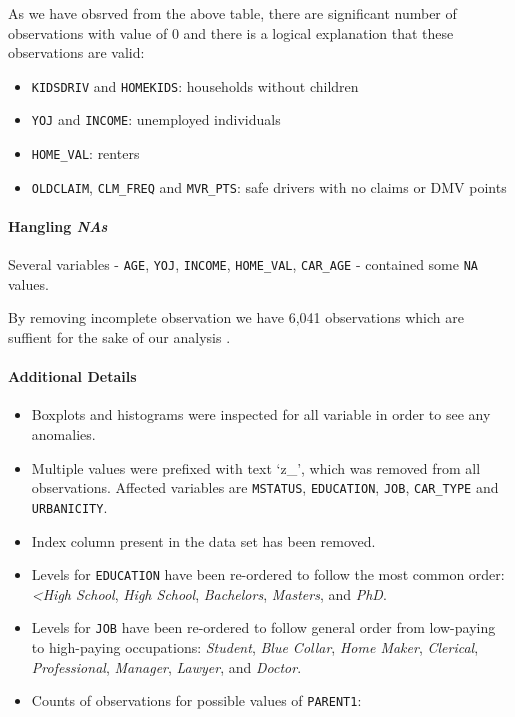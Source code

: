 \documentclass[]{article}
\providecommand{\tightlist}{%
  \setlength{\itemsep}{0pt}\setlength{\parskip}{0pt}}
\let\oldparagraph\paragraph
\renewcommand{\paragraph}[1]{\oldparagraph{#1}\mbox{}}
\begin{document}
As we have obsrved from the above table, there are significant number of
observations with value of 0 and there is a logical explanation that
these observations are valid:

\begin{itemize}
\tightlist
\item
  \texttt{KIDSDRIV} and \texttt{HOMEKIDS}: households without children
\item
  \texttt{YOJ} and \texttt{INCOME}: unemployed individuals
\item
  \texttt{HOME\_VAL}: renters
\item
  \texttt{OLDCLAIM}, \texttt{CLM\_FREQ} and \texttt{MVR\_PTS}: safe
  drivers with no claims or DMV points
\end{itemize}

\paragraph{\texorpdfstring{Hangling
\emph{NAs}}{Hangling NAs}}\label{hangling-nas}

Several variables - \texttt{AGE}, \texttt{YOJ}, \texttt{INCOME},
\texttt{HOME\_VAL}, \texttt{CAR\_AGE} - contained some \texttt{NA}
values.

By removing incomplete observation we have 6,041 observations which are
suffient for the sake of our analysis .

\paragraph{Additional Details}\label{additional-details}

\begin{itemize}
\tightlist
\item
  Boxplots and histograms were inspected for all variable in order to
  see any anomalies.
\item
  Multiple values were prefixed with text `z\_', which was removed from
  all observations. Affected variables are \texttt{MSTATUS},
  \texttt{EDUCATION}, \texttt{JOB}, \texttt{CAR\_TYPE} and
  \texttt{URBANICITY}.
\item
  Index column present in the data set has been removed.
\item
  Levels for \texttt{EDUCATION} have been re-ordered to follow the most
  common order: \emph{\textless{}High School}, \emph{High School},
  \emph{Bachelors}, \emph{Masters}, and \emph{PhD}.
\item
  Levels for \texttt{JOB} have been re-ordered to follow general order
  from low-paying to high-paying occupations: \emph{Student}, \emph{Blue
  Collar}, \emph{Home Maker}, \emph{Clerical}, \emph{Professional},
  \emph{Manager}, \emph{Lawyer}, and \emph{Doctor}.
\item
  Counts of observations for possible values of \texttt{PARENT1}:
\end{itemize}
\end{document}
